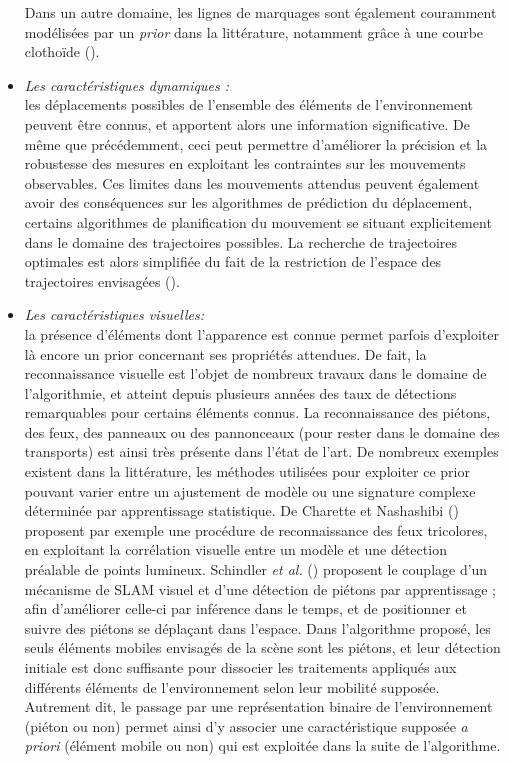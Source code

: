 \begin{itemize}
	Dans un autre domaine, les lignes de marquages sont également couramment modélisées par un \textit{prior} dans la littérature, notamment grâce à une courbe clothoïde (\cite{Vacek2006}).\\
	
	\item {\textit{Les caractéristiques dynamiques : \\}}
	les déplacements possibles de l'ensemble des éléments de l'environnement peuvent être connus, et apportent alors une information significative. De même que précédemment, ceci peut permettre d'améliorer la précision et la robustesse des mesures en exploitant les contraintes sur les mouvements observables. Ces limites dans les mouvements attendus peuvent également avoir des conséquences sur les algorithmes de prédiction du déplacement, certains algorithmes de planification du mouvement se situant explicitement dans le domaine des trajectoires possibles. La recherche de trajectoires optimales est alors simplifiée du fait de la restriction de l'espace des trajectoires envisagées (\cite{Klancar2010}).\\
	
	\item{\textit{Les caractéristiques visuelles:}\\}
	la présence d'éléments dont l'apparence est connue permet parfois d'exploiter là encore un prior concernant ses propriétés attendues. De fait, la reconnaissance visuelle est l'objet de nombreux travaux dans le domaine de l'algorithmie, et atteint depuis plusieurs années des taux de détections remarquables pour certains éléments connus. La reconnaissance des piétons, des feux, des panneaux ou des pannonceaux (pour rester dans le domaine des transports) est ainsi très présente dans l'état de l'art. De nombreux exemples existent dans la littérature, les méthodes utilisées pour exploiter ce prior pouvant varier entre un ajustement de modèle ou une signature complexe déterminée par apprentissage statistique. De Charette et Nashashibi (\cite{Charette2009}) proposent par exemple une procédure de reconnaissance des feux tricolores, en exploitant la corrélation  visuelle entre un modèle et une détection préalable de points lumineux. Schindler \textit{et al.} (\cite{Schindler2010}) proposent le couplage d'un mécanisme de SLAM visuel et d'une détection de piétons par apprentissage ; afin d'améliorer celle-ci par inférence dans le temps, et de positionner et suivre des piétons se déplaçant dans l'espace. Dans l'algorithme proposé, les seuls éléments mobiles envisagés de la scène sont les piétons, et leur détection initiale est donc suffisante pour dissocier les traitements appliqués aux différents éléments de l'environnement selon leur mobilité supposée. Autrement dit, le passage par une représentation binaire de l'environnement (piéton ou non) permet ainsi d'y associer une caractéristique supposée \emph{a priori} (élément mobile ou non) qui est exploitée dans la suite de l'algorithme.\\
\end{itemize}


